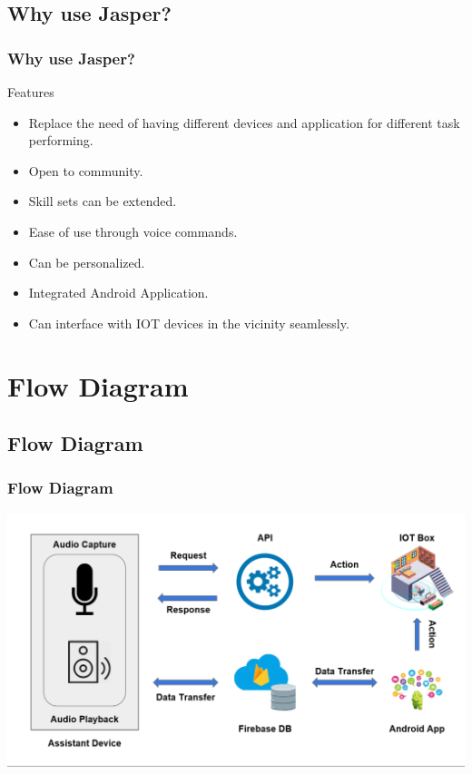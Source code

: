 \documentclass[xcolor=dvipsnames]{beamer}
\begin{document}
\subsection{Why use Jasper?}
\begin{frame}[fragile] %
\frametitle{Why use Jasper?}
\begin{exampleblock}{Features}
\begin{itemize}
\item Replace the need of having different devices and application for different task performing.
\item Open to community.
\item Skill sets can be extended.
\item Ease of use through voice commands.
\item Can be personalized.
\item Integrated Android Application.
\item Can interface with IOT devices in the vicinity seamlessly. 
\end{itemize}
\end{exampleblock}
\end{frame}

\section{Flow Diagram}
\subsection*{Flow Diagram}
\begin{frame}
\frametitle{Flow Diagram}
\begin{center}
\includegraphics[scale=0.34]{images/Arckin.png}
\end{center}
\end{frame}
\end{document}
